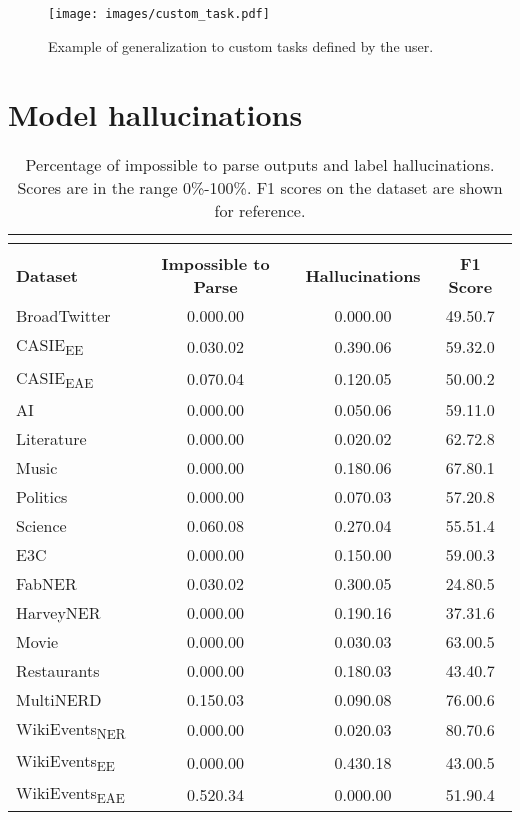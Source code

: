 \documentclass{article} \usepackage{iclr2024_conference,times}
\newcommand{\GoLLIE}{\scalerel*{\texttt{[image: logo/GoLLIE.pdf]}}{\textrm{\textbigcircle}} }
\begin{document}
\begin{figure}[!htb]
    \centering
    \texttt{[image: images/custom\_task.pdf]}
    \caption{Example of generalization to custom tasks defined by the user.}
    \label{fig:custom-example}
\end{figure}



\section{Model hallucinations}

\begin{table}[htb]
\caption{Percentage of impossible to parse outputs and label hallucinations. Scores are in the range 0\%-100\%. F1 scores on the dataset are shown for reference.}
\centering
\small
\begin{tabular}{@{}lccc@{}}
\multicolumn{4}{c}{} \\
\toprule
 & \multicolumn{3}{c}{\GoLLIE} \\ \cmidrule(l){2-4} 
\textbf{Dataset} & \textbf{Impossible to Parse} & \textbf{Hallucinations} & \textbf{F1 Score} \\ \midrule
BroadTwitter & 0.00\tiny{0.00} & 0.00\tiny{0.00} & 49.5\tiny{0.7} \\
CASIE\textsubscript{EE} & 0.03\tiny{0.02} & 0.39\tiny{0.06} & 59.3\tiny{2.0} \\
CASIE\textsubscript{EAE} & 0.07\tiny{0.04}  & 0.12\tiny{0.05} & 50.0\tiny{0.2} \\
AI & 0.00\tiny{0.00} & 0.05\tiny{0.06} & 59.1\tiny{1.0} \\
Literature & 0.00\tiny{0.00}  & 0.02\tiny{0.02} & 62.7\tiny{2.8} \\
Music & 0.00\tiny{0.00}  & 0.18\tiny{0.06} & 67.8\tiny{0.1} \\
Politics & 0.00\tiny{0.00}  & 0.07\tiny{0.03} & 57.2\tiny{0.8} \\
Science & 0.06\tiny{0.08}  & 0.27\tiny{0.04} & 55.5\tiny{1.4} \\
E3C & 0.00\tiny{0.00}  & 0.15\tiny{0.00} & 59.0\tiny{0.3} \\
FabNER & 0.03\tiny{0.02}  & 0.30\tiny{0.05} & 24.8\tiny{0.5} \\
HarveyNER & 0.00\tiny{0.00}  & 0.19\tiny{0.16} & 37.3\tiny{1.6} \\
Movie & 0.00\tiny{0.00}  & 0.03\tiny{0.03} & 63.0\tiny{0.5} \\
Restaurants & 0.00\tiny{0.00}  & 0.18\tiny{0.03} & 43.4\tiny{0.7} \\
MultiNERD & 0.15\tiny{0.03}  & 0.09\tiny{0.08} & 76.0\tiny{0.6} \\
WikiEvents\textsubscript{NER} & 0.00\tiny{0.00}  & 0.02\tiny{0.03} & 80.7\tiny{0.6} \\
WikiEvents\textsubscript{EE} & 0.00\tiny{0.00}  & 0.43\tiny{0.18} & 43.0\tiny{0.5} \\
WikiEvents\textsubscript{EAE} & 0.52\tiny{0.34}  & 0.00\tiny{0.00} & 51.9\tiny{0.4} \\ \bottomrule
\end{tabular}
\label{tab:Hallucination}
\end{table}
\end{document}
